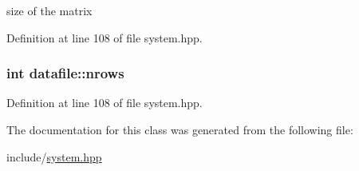 size of the matrix 



Definition at line 108 of file system.\-hpp.

\hypertarget{classdatafile_a7e9acc3d0f772c18910a6d86741ef4f5}{
\subsubsection[{nrows}]{\setlength{\rightskip}{0pt plus 5cm}int datafile\-::nrows\hspace{0.3cm}{\ttfamily [private]}}}\label{classdatafile_a7e9acc3d0f772c18910a6d86741ef4f5}


Definition at line 108 of file system.\-hpp.



The documentation for this class was generated from the following file\-:\begin{DoxyCompactItemize}
\item 
include/\hyperlink{system_8hpp}{system.\-hpp}\end{DoxyCompactItemize}

